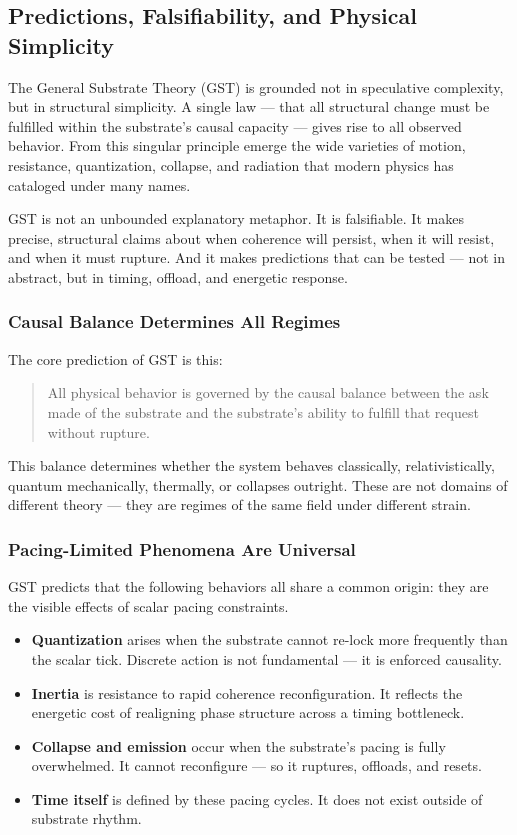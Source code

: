 \documentclass[entropy,article,submit,pdftex,moreauthors]{Definitions/mdpi}
\begin{document}
\subsection{Predictions, Falsifiability, and Physical Simplicity}

The General Substrate Theory (GST) is grounded not in speculative complexity, but in structural simplicity. A single law — that all structural change must be fulfilled within the substrate's causal capacity — gives rise to all observed behavior. From this singular principle emerge the wide varieties of motion, resistance, quantization, collapse, and radiation that modern physics has cataloged under many names.

GST is not an unbounded explanatory metaphor. It is falsifiable. It makes precise, structural claims about when coherence will persist, when it will resist, and when it must rupture. And it makes predictions that can be tested — not in abstract, but in timing, offload, and energetic response.

\subsubsection*{Causal Balance Determines All Regimes}

The core prediction of GST is this:

\begin{quote}
All physical behavior is governed by the causal balance between the ask made of the substrate and the substrate’s ability to fulfill that request without rupture.
\end{quote}

This balance determines whether the system behaves classically, relativistically, quantum mechanically, thermally, or collapses outright. These are not domains of different theory — they are regimes of the same field under different strain.

\subsubsection*{Pacing-Limited Phenomena Are Universal}

GST predicts that the following behaviors all share a common origin: they are the visible effects of scalar pacing constraints.

\begin{itemize}
    \item \textbf{Quantization} arises when the substrate cannot re-lock more frequently than the scalar tick. Discrete action is not fundamental — it is enforced causality.
    \item \textbf{Inertia} is resistance to rapid coherence reconfiguration. It reflects the energetic cost of realigning phase structure across a timing bottleneck.
    \item \textbf{Collapse and emission} occur when the substrate’s pacing is fully overwhelmed. It cannot reconfigure — so it ruptures, offloads, and resets.
    \item \textbf{Time itself} is defined by these pacing cycles. It does not exist outside of substrate rhythm.
\end{itemize}
\end{document}

